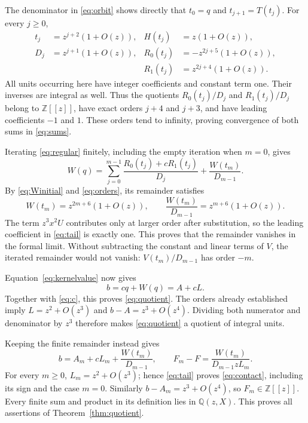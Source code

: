 \documentclass[11pt]{article}
\newcommand{\Z}{\mathbb Z}
\newcommand{\Q}{\mathbb Q}
\begin{document}
The denominator in \eqref{eq:orbit} shows directly that
$t_0=q$ and $t_{j+1}=T(t_j)$. For every $j\ge0$,
\begin{align}
 t_j&=z^{j+2}(1+O(z)), &
 H(t_j)&=z(1+O(z)),\nonumber\\
 D_j&=z^{j+1}(1+O(z)), &
 R_0(t_j)&=-z^{2j+5}(1+O(z)),\label{eq:orders}\\
 &&R_1(t_j)&=z^{2j+4}(1+O(z)).\nonumber
\end{align}
All units occurring here have integer coefficients and constant term
one. Their inverses are integral as well. Thus the quotients
$R_0(t_j)/D_j$ and $R_1(t_j)/D_j$ belong to $\Z[[z]]$, have exact
orders $j+4$ and $j+3$, and have leading coefficients $-1$ and $1$.
These orders tend to infinity, proving convergence of both sums
in \eqref{eq:sums}.

Iterating \eqref{eq:regular} finitely, including the empty iteration
when $m=0$, gives
\begin{equation}\label{eq:iteration}
 W(q)=\sum_{j=0}^{m-1}\frac{R_0(t_j)+cR_1(t_j)}{D_j}
       +\frac{W(t_m)}{D_{m-1}}.
\end{equation}
By \eqref{eq:Winitial} and \eqref{eq:orders}, its remainder satisfies
\begin{equation}\label{eq:tail}
 W(t_m)=z^{2m+6}(1+O(z)),\qquad
 \frac{W(t_m)}{D_{m-1}}=z^{m+6}(1+O(z)).
\end{equation}
The term $z^3x^2U$ contributes only at larger order after substitution,
so the leading coefficient in \eqref{eq:tail} is exactly one.
This proves that the remainder vanishes in the formal limit.
Without subtracting the constant and linear terms of $V$, the iterated
remainder would not vanish: $V(t_m)/D_{m-1}$ has order $-m$.

Equation~\eqref{eq:kernelvalue} now gives
\[
 b=cq+W(q)=A+cL.
\]
Together with \eqref{eq:c}, this proves \eqref{eq:quotient}.
The orders already established imply $L=z^2+O(z^3)$ and
$b-A=z^3+O(z^4)$. Dividing both numerator and denominator by $z^3$
therefore makes \eqref{eq:quotient} a quotient of integral units.

Keeping the finite remainder instead gives
\[
 b=A_m+cL_m+\frac{W(t_m)}{D_{m-1}},\qquad
 F_m-F=\frac{W(t_m)}{D_{m-1}zL_m}.
\]
For every $m\ge0$, $L_m=z^2+O(z^3)$; hence \eqref{eq:tail} proves
\eqref{eq:contact}, including its sign and the case $m=0$.
Similarly $b-A_m=z^3+O(z^4)$, so $F_m\in\Z[[z]]$.
Every finite sum and product in its definition lies in $\Q(z,X)$.
This proves all assertions of Theorem~\ref{thm:quotient}.
\end{document}
